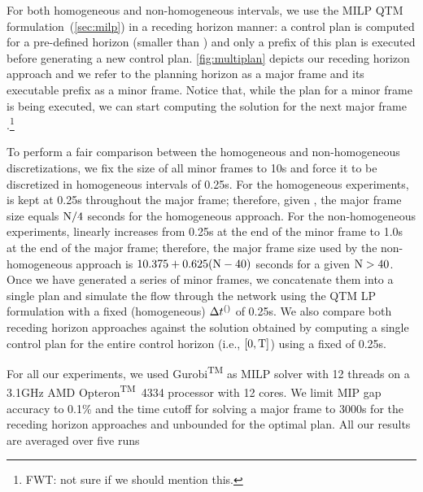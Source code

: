 For both homogeneous and non-homogeneous intervals, we use the MILP QTM
formulation~(\cref{sec:milp}) in a receding horizon manner: a control plan is
computed for a pre-defined horizon (smaller than \TMAX) and only a prefix of
this plan is executed before generating a new control plan. 
%
\cref{fig:multiplan} depicts our receding horizon approach and we refer to the
planning horizon as a major frame and its executable prefix as a minor frame.
%
Notice that, while the plan for a minor frame is being executed, we can start
computing the solution for the next major frame .\footnote{FWT: not sure if we should mention this.}


To perform a fair comparison between the homogeneous and non-homogeneous
discretizations, we fix the size of all minor frames to 10s and force it to be
discretized in homogeneous intervals of 0.25s.
%
For the homogeneous experiments, \DT[] is kept at 0.25s throughout the major
frame; therefore, given \Nn, the major frame size equals $\Nn/4$ seconds for the
homogeneous approach.
%
For the non-homogeneous experiments, \DT[] linearly increases from
0.25s at the end of the minor frame to 1.0s at the end of the major frame;
therefore, the major frame size used by the non-homogeneous approach
is $10.375 + 0.625(\Nn-40)$ seconds for a given $\Nn > 40$.
%
%
Once we have generated a series of minor frames, we concatenate them into a
single plan and simulate the flow through the network using the QTM LP
formulation with a fixed (homogeneous) $\DT[]$ of 0.25s.
%
%
We also compare both receding horizon approaches against the 
solution obtained by computing a single control plan for the entire control
horizon (i.e., $[0,\TMAX]$) using a fixed \DT[] of 0.25s.


For all our experiments, we used Gurobi\textsuperscript{TM} as MILP solver with
12 threads on a 3.1GHz AMD Opteron\textsuperscript{TM}~4334 processor with 12
cores.
%
We limit MIP gap accuracy to 0.1\% and the time cutoff for solving a major frame
to 3000s for the receding horizon approaches and unbounded for the optimal plan.
%
%
All our results are averaged over five runs 


